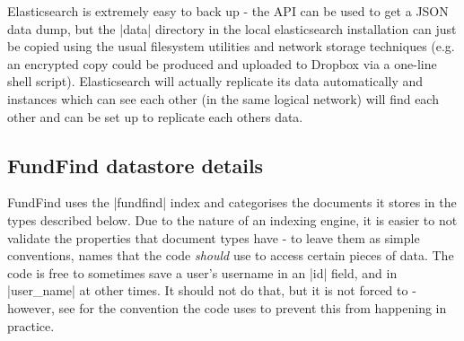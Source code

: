  Elasticsearch is extremely easy to back up - the API can be used to get a JSON data dump, but the |data| directory in the local elasticsearch installation can just be copied using the usual filesystem utilities and network storage techniques (e.g. an encrypted copy could be produced and uploaded to Dropbox via a one-line shell script). Elasticsearch will actually replicate its data automatically and instances which can see each other (in the same logical network) will find each other and can be set up to replicate each others data.

\subsection{FundFind datastore details}
\label{datastore-details}
FundFind uses the |fundfind| index and categorises the documents it stores in the types described below. Due to the nature of an indexing engine, it is easier to not validate the properties that document types have - to leave them as simple conventions, names that the code \emph{should} use to access certain pieces of data. The code is free to sometimes save a user's username in an |id| field, and in |user_name| at other times. It should not do that, but it is not forced to - however, see  for the convention the code uses to prevent this from happening in practice.



